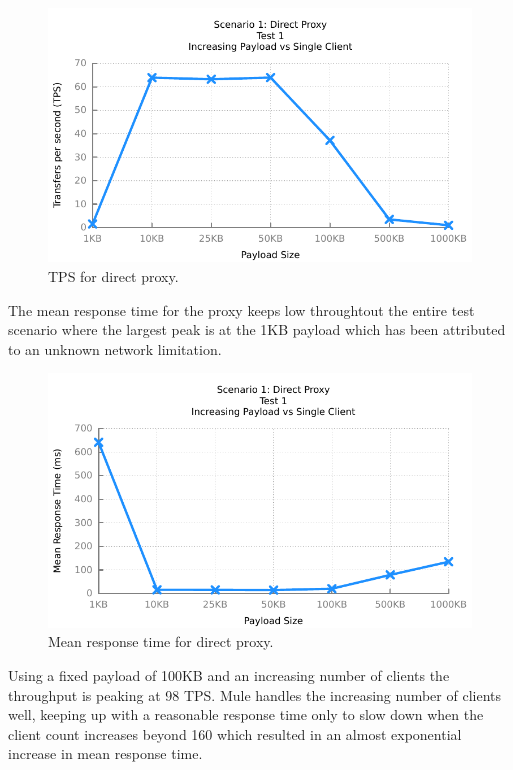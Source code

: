 \begin{figure}[H]
	\caption{TPS for direct proxy.}
	\centerline{\includegraphics{img/proxy_fu_ip_tps}}
	\label{fig:proxy-1-1}
\end{figure}

The mean response time for the proxy keeps low throughtout the entire test scenario where the largest peak is at the 1KB payload which has been attributed to an unknown network limitation.

\begin{figure}[H]
	\caption{Mean response time for direct proxy.}
	\centerline{\includegraphics{img/proxy_fu_ip_resp}}
	\label{fig:proxy-1-2}
\end{figure}

Using a fixed payload of 100KB and an increasing number of clients the throughput is peaking at 98 TPS. Mule handles the increasing number of clients well, keeping up with a reasonable response time only to slow down when the client count increases beyond 160 which resulted in an almost exponential increase in mean response time.

